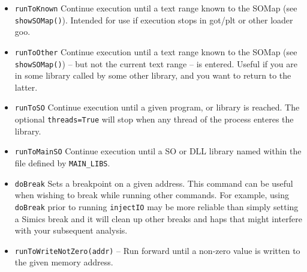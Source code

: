 \documentclass[titlepage]{article}
\begin{document}
\begin{itemize}
\item {\tt runToKnown} Continue execution until a text range known to the SOMap (see {\tt showSOMap()}).  Intended for use if execution stops in got/plt 
or other loader goo.

\item {\tt runToOther} Continue execution until a text range known to the SOMap (see {\tt showSOMap()}) -- but not the current text range -- is entered.
Useful if you are in some library called by some other library, and you want to return to the latter.

\item {\tt runToSO} Continue execution until a given program, or library is reached.  The optional {\tt threads=True} will stop when any thread of the
process enteres the library.
\item {\tt runToMainSO} Continue execution until a SO or DLL library named within the file defined by {\tt MAIN\_LIBS}.

\item {\tt doBreak} Sets a breakpoint on a given address.  This command can be useful when wishing to break while running other commands.  For example,
using {\tt doBreak} prior to running {\tt injectIO} may be more reliable than simply setting a Simics break and it will clean up other breaks and haps that 
might interfere with your subsequent analysis.

\item {\tt runToWriteNotZero(addr)} – Run forward until a non-zero value is written to the given memory address.


\end{itemize}
\end{document}

